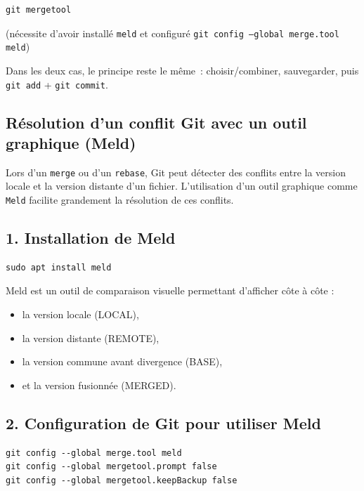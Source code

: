 \documentclass[11pt,a4paper]{article}
\begin{document}
\begin{lstlisting}[style=bashstyle]
git mergetool
\end{lstlisting}

(nécessite d'avoir installé \texttt{meld} et configuré \texttt{git config --global merge.tool meld})

Dans les deux cas, le principe reste le même~: choisir/combiner, sauvegarder, puis \texttt{git add} + \texttt{git commit}.

\subsection*{Résolution d’un conflit Git avec un outil graphique (Meld)}

Lors d’un \texttt{merge} ou d’un \texttt{rebase}, Git peut détecter des conflits
entre la version locale et la version distante d’un fichier.  
L’utilisation d’un outil graphique comme \texttt{Meld} facilite grandement la
résolution de ces conflits.

\subsection*{1. Installation de Meld}

\begin{lstlisting}[style=bashstyle]
sudo apt install meld
\end{lstlisting}

Meld est un outil de comparaison visuelle permettant d’afficher côte à côte :
\begin{itemize}
	\item la version locale (LOCAL),
	\item la version distante (REMOTE),
	\item la version commune avant divergence (BASE),
	\item et la version fusionnée (MERGED).
\end{itemize}

\subsection*{2. Configuration de Git pour utiliser Meld}

\begin{lstlisting}[style=bashstyle]
git config --global merge.tool meld
git config --global mergetool.prompt false
git config --global mergetool.keepBackup false
\end{lstlisting}
\end{document}
